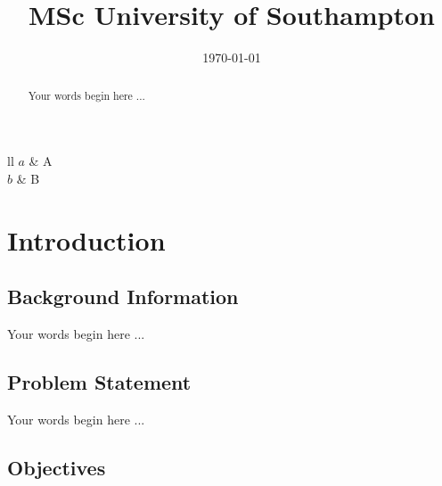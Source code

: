 \documentclass[oneside]{ecsthesis}       %
\title{MSc University of Southampton} %
\date{\today}
\begin{document}
\maketitle
\begin{abstract}

Your words begin here ...

\end{abstract}



\tableofcontents                           %

\listoffigures                             %

\listoftables                              %


\listofsymbols                             %
{ll}{
	$a$ & A	\\
	$b$ & B	
}

\mainmatter

\chapter{Introduction} \label{Chapter:introduction}

\section{Background Information}\label{background-information}

Your words begin here ...

\section{Problem Statement}\label{problem-statement}

Your words begin here ...

\section{Objectives}\label{objectives}
\end{document}
